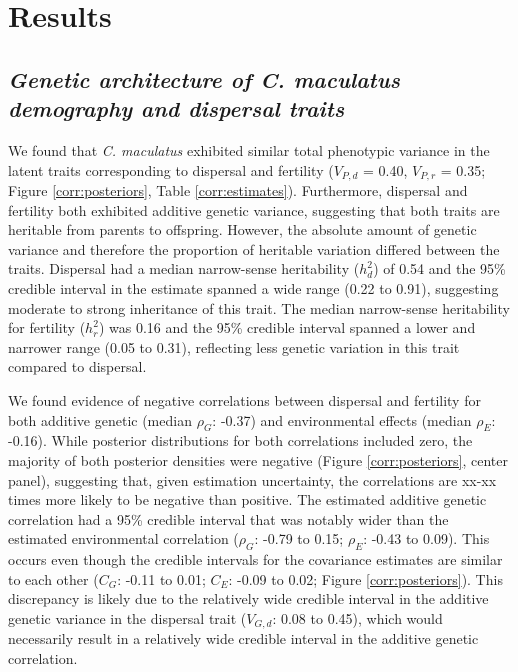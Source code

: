 \documentclass[11pt]{article}
\newcommand{\tom}[1]{{\textit{\color{WildStrawberry}{[#1]}}}}
\begin{document}
\section*{Results}

\subsection*{\textit{Genetic architecture of \textup{C. maculatus} demography and dispersal traits}}
We found that \textit{C. maculatus} exhibited similar total phenotypic variance in the latent traits corresponding to dispersal and fertility ($V_{P,d}$  = 0.40, $V_{P,r}$  = 0.35; Figure \ref{corr:posteriors}, Table \ref{corr:estimates}).
Furthermore, dispersal and fertility both exhibited additive genetic variance, suggesting that both traits are heritable from parents to offspring.
However, the absolute amount of genetic variance and therefore the proportion of heritable variation differed between the traits.
Dispersal had a median narrow-sense heritability ($h^{2}_{d}$) of 0.54 and the 95\% credible interval in the estimate spanned a wide range (0.22 to 0.91), suggesting moderate to strong inheritance of this trait.
The median narrow-sense heritability for fertility ($h^{2}_{r}$) was 0.16 and the 95\% credible interval spanned a lower and narrower range (0.05 to 0.31), reflecting less genetic variation in this trait compared to dispersal.

We found evidence of negative correlations between dispersal and fertility for both additive genetic (median $\rho_{G}$: -0.37) and environmental effects (median $\rho_{E}$: -0.16).
While posterior distributions for both correlations included zero, the majority of both posterior densities were negative (Figure \ref{corr:posteriors}, center panel), suggesting that, given estimation uncertainty, the correlations are xx-xx times more likely to be negative than positive.
\tom{[My though here is that we can quantify how much of the posterior is negative vs positive, and this gives us a sense of confidence in the conclusion that correlations are negative.]}
The estimated additive genetic correlation had a 95\% credible interval that was notably wider than the estimated environmental correlation ($\rho_{G}$: -0.79 to 0.15; $\rho_{E}$: -0.43 to 0.09).
This occurs even though the credible intervals for the covariance estimates are similar to each other ($C_{G}$: -0.11 to 0.01; $C_{E}$: -0.09 to 0.02; Figure \ref{corr:posteriors}).
This discrepancy is likely due to the relatively wide credible interval in the additive genetic variance in the dispersal trait ($V_{G,d}$: 0.08 to 0.45), which would necessarily result in a relatively wide credible interval in the additive genetic correlation.
\tom{[I don't think this is super important but I actually do not follow this argument. I think part of my confusion is that I am not sure where the correlation estimates come from (comment above where you say they were ``calculated'').
For related reasons, I think the covariances can be dropped from this figure, since they simply integrate the variances and correlations.]}
\end{document}
